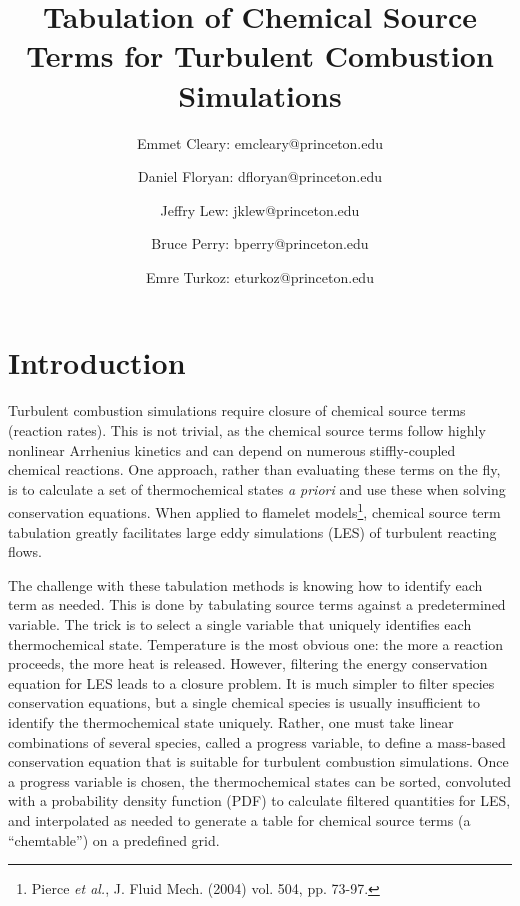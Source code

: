 \documentclass[11pt]{article}
\begin{document}
\title{\textbf{Tabulation of Chemical Source Terms for Turbulent
    Combustion Simulations}}

\author{Emmet Cleary: emcleary@princeton.edu \and Daniel Floryan:
  dfloryan@princeton.edu \and Jeffry Lew: jklew@princeton.edu \and
  Bruce Perry: bperry@princeton.edu \and Emre Turkoz:
  eturkoz@princeton.edu} 

\maketitle

\section{Introduction}
Turbulent combustion simulations require closure of chemical source
terms (reaction rates). This is not trivial, as the chemical source
terms follow highly nonlinear Arrhenius kinetics and can depend on
numerous stiffly-coupled chemical reactions. One approach, rather than
evaluating these terms on the fly, is to calculate a set of
thermochemical states \textit{a priori} and use these when solving
conservation equations. When applied to flamelet
models\footnote{Pierce \textit{et al.}, J. Fluid Mech. (2004)
  vol. 504, pp. 73-97.}, chemical source term tabulation greatly
facilitates large eddy simulations (LES) of turbulent reacting flows.

The challenge with these tabulation methods is knowing how to identify
each term as needed.  This is done by tabulating source terms against
a predetermined variable. The trick is to select a single variable
that uniquely identifies each thermochemical state. Temperature is the
most obvious one: the more a reaction proceeds, the more heat is
released. However, filtering the energy conservation equation for LES
leads to a closure problem. It is much simpler to filter species
conservation equations, but a single chemical species is usually
insufficient to identify the thermochemical state uniquely. Rather,
one must take linear combinations of several species, called a
progress variable, to define a mass-based conservation equation that
is suitable for turbulent combustion simulations. Once a progress
variable is chosen, the thermochemical states can be sorted,
convoluted with a probability density function (PDF) to calculate
filtered quantities for LES, and interpolated as needed to generate a
table for chemical source terms (a “chemtable”) on a predefined grid.
\end{document}
